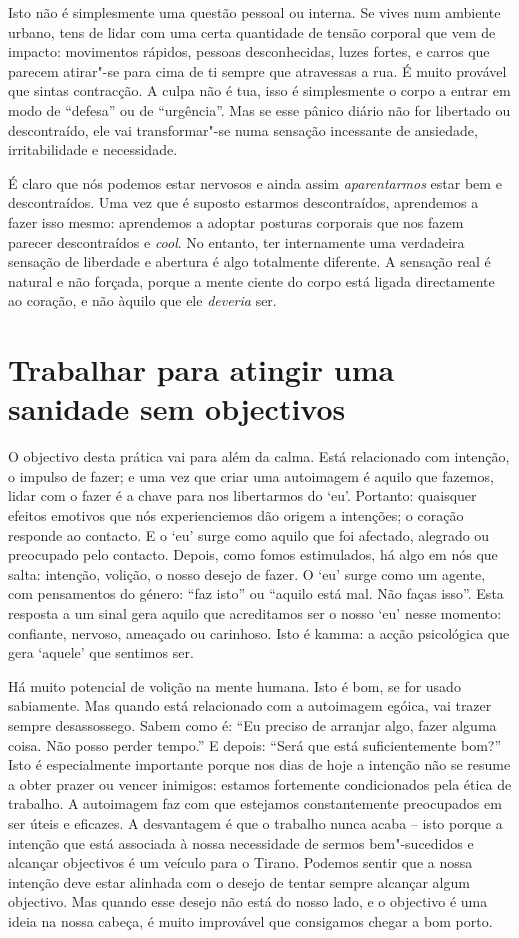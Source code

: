 Isto não é simplesmente uma questão pessoal ou interna. Se vives num
ambiente urbano, tens de lidar com uma certa quantidade de tensão
corporal que vem de impacto: movimentos rápidos, pessoas desconhecidas,
luzes fortes, e carros que parecem atirar"-se para cima de ti sempre que
atravessas a rua. É muito provável que sintas contracção. A culpa não é
tua, isso é simplesmente o corpo a entrar em modo de “defesa” ou de
“urgência”. Mas se esse pânico diário não for libertado ou descontraído,
ele vai transformar"-se numa sensação incessante de ansiedade,
irritabilidade e necessidade.

É claro que nós podemos estar nervosos e ainda assim \emph{aparentarmos}
estar bem e descontraídos. Uma vez que é suposto estarmos descontraídos,
aprendemos a fazer isso mesmo: aprendemos a adoptar posturas corporais
que nos fazem parecer descontraídos e \emph{cool}. No entanto, ter
internamente uma verdadeira sensação de liberdade e abertura é algo
totalmente diferente. A sensação real é natural e não forçada, porque a
mente ciente do corpo está ligada directamente ao coração, e não àquilo
que ele \emph{deveria} ser.

\section{Trabalhar para atingir uma sanidade sem objectivos}

O objectivo desta prática vai para além da calma. Está relacionado com
intenção, o impulso de fazer; e uma vez que criar uma autoimagem é
aquilo que fazemos, lidar com o fazer é a chave para nos libertarmos do
`eu'. Portanto: quaisquer efeitos emotivos que nós experienciemos dão
origem a intenções; o coração responde ao contacto. E o `eu' surge como
aquilo que foi afectado, alegrado ou preocupado pelo contacto. Depois,
como fomos estimulados, há algo em nós que salta: intenção, volição, o
nosso desejo de fazer. O `eu' surge como um agente, com pensamentos do
género: “faz isto” ou “aquilo está mal. Não faças isso”. Esta resposta a
um sinal gera aquilo que acreditamos ser o nosso `eu' nesse momento:
confiante, nervoso, ameaçado ou carinhoso. Isto é kamma: a acção
psicológica que gera `aquele' que sentimos ser.

Há muito potencial de volição na mente humana. Isto é bom, se for usado
sabiamente. Mas quando está relacionado com a autoimagem egóica, vai
trazer sempre desassossego. Sabem como é: “Eu preciso de arranjar algo,
fazer alguma coisa. Não posso perder tempo.” E depois: “Será que está
suficientemente bom?” Isto é especialmente importante porque nos dias de
hoje a intenção não se resume a obter prazer ou vencer inimigos: estamos
fortemente condicionados pela ética de trabalho. A autoimagem faz com
que estejamos constantemente preocupados em ser úteis e eficazes. A
desvantagem é que o trabalho nunca acaba -- isto porque a intenção que
está associada à nossa necessidade de sermos bem"-sucedidos e alcançar
objectivos é um veículo para o Tirano. Podemos sentir que a nossa
intenção deve estar alinhada com o desejo de tentar sempre alcançar
algum objectivo. Mas quando esse desejo não está do nosso lado, e o
objectivo é uma ideia na nossa cabeça, é muito improvável que consigamos
chegar a bom porto.

